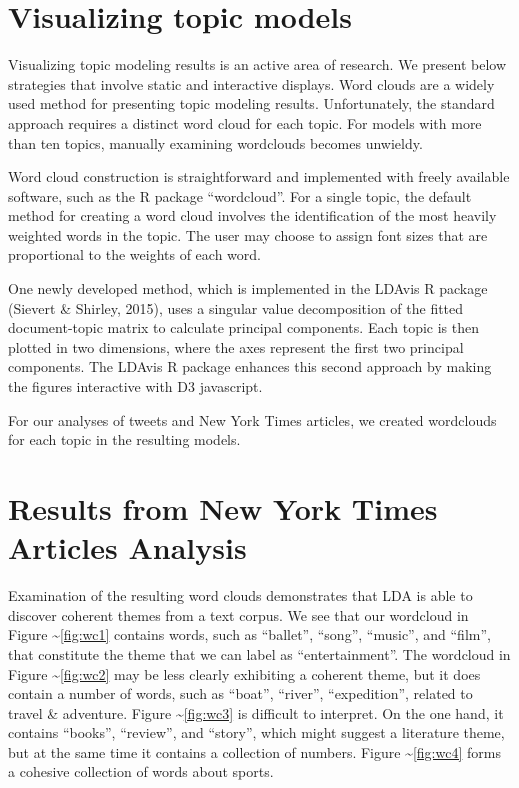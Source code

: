 \documentclass[12pt,]{article}
\begin{document}
\section{Visualizing topic models}\label{visualizing-topic-models}

Visualizing topic modeling results is an active area of research. We
present below strategies that involve static and interactive displays.
Word clouds are a widely used method for presenting topic modeling
results. Unfortunately, the standard approach requires a distinct word
cloud for each topic. For models with more than ten topics, manually
examining wordclouds becomes unwieldy.

Word cloud construction is straightforward and implemented with freely
available software, such as the R package ``wordcloud''. For a single
topic, the default method for creating a word cloud involves the
identification of the most heavily weighted words in the topic. The user
may choose to assign font sizes that are proportional to the weights of
each word.

One newly developed method, which is implemented in the LDAvis R package
(Sievert \& Shirley, 2015), uses a singular value decomposition of the
fitted document-topic matrix to calculate principal components. Each
topic is then plotted in two dimensions, where the axes represent the
first two principal components. The LDAvis R package enhances this
second approach by making the figures interactive with D3 javascript.

For our analyses of tweets and New York Times articles, we created
wordclouds for each topic in the resulting models.

\section{Results from New York Times Articles
Analysis}\label{results-from-new-york-times-articles-analysis}

Examination of the resulting word clouds demonstrates that LDA is able
to discover coherent themes from a text corpus. We see that our
wordcloud in Figure \textasciitilde{}\ref{fig:wc1} contains words, such
as ``ballet'', ``song'', ``music'', and ``film'', that constitute the
theme that we can label as ``entertainment''. The wordcloud in Figure
\textasciitilde{}\ref{fig:wc2} may be less clearly exhibiting a coherent
theme, but it does contain a number of words, such as ``boat'',
``river'', ``expedition'', related to travel \& adventure. Figure
\textasciitilde{}\ref{fig:wc3} is difficult to interpret. On the one
hand, it contains ``books'', ``review'', and ``story'', which might
suggest a literature theme, but at the same time it contains a
collection of numbers. Figure \textasciitilde{}\ref{fig:wc4} forms a
cohesive collection of words about sports.
\end{document}
